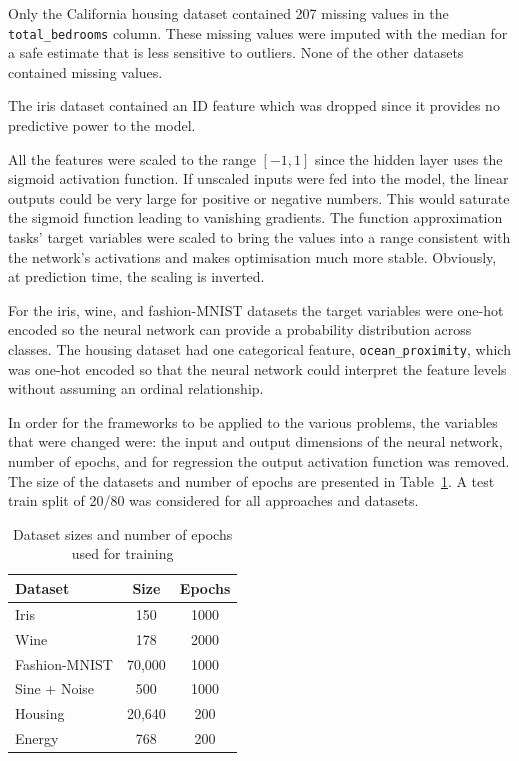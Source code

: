 \documentclass[10pt, conference]{IEEEtran}
\begin{document}
Only the California housing dataset contained 207 missing values in the \texttt{total\_bedrooms} column. These missing values were imputed with the median for a safe estimate that is less sensitive to outliers. None of the other datasets contained missing values.

The iris dataset contained an ID feature which was dropped since it provides no predictive power to the model.

All the features were scaled to the range $[-1, 1]$ since the hidden layer uses the sigmoid activation function. If unscaled inputs were fed into the model, the linear outputs could be very large for positive or negative numbers. This would saturate the sigmoid function leading to vanishing gradients. The function approximation tasks' target variables were scaled to bring the values into a range consistent with the network's activations and makes optimisation much more stable. Obviously, at prediction time, the scaling is inverted.

For the iris, wine, and fashion-MNIST datasets the target variables were one-hot encoded so the neural network can provide a probability distribution across classes. The housing dataset had one categorical feature, \texttt{ocean\_proximity}, which was one-hot encoded so that the neural network could interpret the feature levels without assuming an ordinal relationship.

In order for the frameworks to be applied to the various problems, the variables that were changed were: the input and output dimensions of the neural network, number of epochs, and for regression the output activation function was removed. The size of the datasets and number of epochs are presented in Table~\ref{tab:dataset_epochs}. A test train split of 20/80 was considered for all approaches and datasets.

\begin{table}[htbp]
	\centering
	\caption{Dataset sizes and number of epochs used for training}
	\begin{tabular}{|l|c|c|}
		\hline
		\textbf{Dataset} & \textbf{Size} & \textbf{Epochs} \\
		\hline
		Iris & 150 & 1000 \\
		Wine & 178 & 2000 \\
		Fashion-MNIST & 70,000 & 1000 \\
		\hline
		Sine + Noise & 500 & 1000 \\
		Housing & 20,640 & 200 \\
		Energy & 768 & 200 \\
		\hline
	\end{tabular}
	\label{tab:dataset_epochs}
\end{table}
\end{document}
